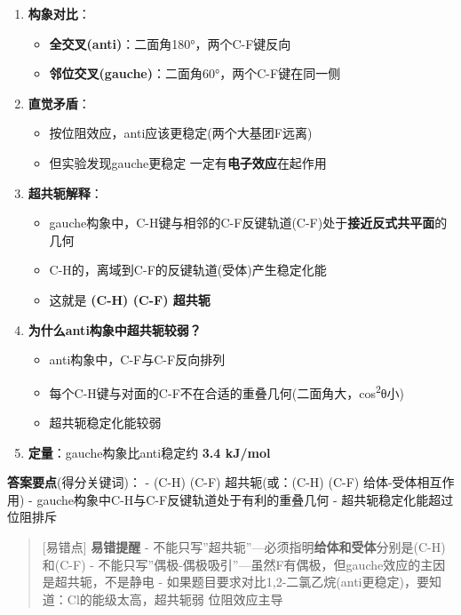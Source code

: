 \begin{enumerate}
\def\labelenumi{\arabic{enumi}.}
\tightlist
\item
  \textbf{构象对比}：

  \begin{itemize}
  \tightlist
  \item
    \textbf{全交叉(anti)}：二面角180°，两个C-F键反向
  \item
    \textbf{邻位交叉(gauche)}：二面角60°，两个C-F键在同一侧
  \end{itemize}
\item
  \textbf{直觉矛盾}：

  \begin{itemize}
  \tightlist
  \item
    按位阻效应，anti应该更稳定(两个大基团F远离)
  \item
    但实验发现gauche更稳定 \箭 一定有\textbf{电子效应}在起作用
  \end{itemize}
\item
  \textbf{超共轭解释}：

  \begin{itemize}
  \tightlist
  \item
    gauche构象中，C-H键与相邻的C-F反键轨道(C-F)处于\textbf{接近反式共平面}的几何
  \item
    C-H的，离域到C-F的反键轨道(受体)\箭 产生稳定化能
  \item
    这就是 \textbf{(C-H) \箭 (C-F) 超共轭}
  \end{itemize}
\item
  \textbf{为什么anti构象中超共轭较弱？}

  \begin{itemize}
  \tightlist
  \item
    anti构象中，C-F与C-F反向排列
  \item
    每个C-H键与对面的C-F不在合适的重叠几何(二面角大，cos\textsuperscript{2}θ小)
  \item
    超共轭稳定化能较弱
  \end{itemize}
\item
  \textbf{定量}：gauche构象比anti稳定约 \textbf{3.4 kJ/mol}
\end{enumerate}

\textbf{答案要点}(得分关键词)：
- (C-H) \箭 (C-F) 超共轭(或：(C-H) \箭 (C-F) 给体-受体相互作用)
- gauche构象中C-H与C-F反键轨道处于有利的重叠几何
- 超共轭稳定化能超过位阻排斥

\begin{quote}
{[}易错点{]} \textbf{易错提醒}
- 不能只写''超共轭''---必须指明\textbf{给体和受体}分别是(C-H)和(C-F)
- 不能只写''偶极-偶极吸引''---虽然F有偶极，但gauche效应的主因是超共轭，不是静电
- 如果题目要求对比1,2-二氯乙烷(anti更稳定)，要知道：Cl的能级太高，超共轭弱 \箭 位阻效应主导
\end{quote}

